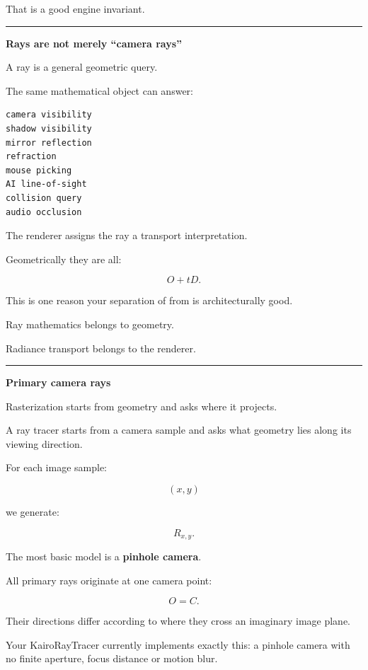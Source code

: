 That is a good engine invariant.

\begin{center}\rule{0.5\linewidth}{0.5pt}\end{center}

\textbf{Rays are not merely ``camera rays''}

A ray is a general geometric query.

The same mathematical object can answer:

\begin{verbatim}
camera visibility
shadow visibility
mirror reflection
refraction
mouse picking
AI line-of-sight
collision query
audio occlusion
\end{verbatim}

The renderer assigns the ray a transport interpretation.

Geometrically they are all:

\[
O+tD.
\]

This is one reason your separation of  from  is architecturally good.

Ray mathematics belongs to geometry.

Radiance transport belongs to the renderer.

\begin{center}\rule{0.5\linewidth}{0.5pt}\end{center}

\textbf{Primary camera rays}

Rasterization starts from geometry and asks where it projects.

A ray tracer starts from a camera sample and asks what geometry lies along its viewing direction.

For each image sample:

\[
(x,y)
\]

we generate:

\[
R_{x,y}.
\]

The most basic model is a \textbf{pinhole camera}.

All primary rays originate at one camera point:

\[
O=C.
\]

Their directions differ according to where they cross an imaginary image plane.

Your KairoRayTracer currently implements exactly this: a pinhole camera with no finite aperture, focus distance or motion blur.

